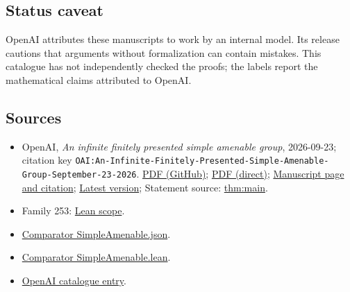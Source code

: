 \documentclass[11pt]{article}
\begin{document}
\subsection{Status caveat}
OpenAI attributes these manuscripts to work by an internal model. Its release cautions that arguments without formalization can contain mistakes. This catalogue has not independently checked the proofs; the labels report the mathematical claims attributed to OpenAI.

\subsection{Sources}
\begin{itemize}
\item OpenAI, \emph{An infinite finitely presented simple amenable group}, 2026-09-23; citation key \texttt{OAI:An-Infinite-Finitely-Presented-Simple-Amenable-Group-September-23-2026}. \href{https://github.com/openai/math/blob/adc7f1241b42e322a6451854ab7e4b4c146bf78a/preprints/An-Infinite-Finitely-Presented-Simple-Amenable-Group-September-23-2026/paper.pdf}{PDF (GitHub)}; \href{https://github.com/openai/math/raw/adc7f1241b42e322a6451854ab7e4b4c146bf78a/preprints/An-Infinite-Finitely-Presented-Simple-Amenable-Group-September-23-2026/paper.pdf}{PDF (direct)}; \href{https://github.com/openai/math/blob/adc7f1241b42e322a6451854ab7e4b4c146bf78a/preprints/An-Infinite-Finitely-Presented-Simple-Amenable-Group-September-23-2026/README.md}{Manuscript page and citation}; \href{https://github.com/openai/math/blob/main/preprints/An-Infinite-Finitely-Presented-Simple-Amenable-Group-September-23-2026/paper.pdf}{Latest version}; Statement source: \href{https://github.com/openai/math/blob/adc7f1241b42e322a6451854ab7e4b4c146bf78a/preprints/An-Infinite-Finitely-Presented-Simple-Amenable-Group-September-23-2026/build/sections/introduction.tex\#L17}{thm:main}.
\item Family 253: \href{https://github.com/openai/math/blob/adc7f1241b42e322a6451854ab7e4b4c146bf78a/lean/docs/253.md}{Lean scope}.
\item \href{https://github.com/openai/math/blob/adc7f1241b42e322a6451854ab7e4b4c146bf78a/lean/ComparatorChallenges/SimpleAmenable.json}{Comparator SimpleAmenable.json}.
\item \href{https://github.com/openai/math/blob/adc7f1241b42e322a6451854ab7e4b4c146bf78a/lean/ComparatorChallenges/SimpleAmenable.lean}{Comparator SimpleAmenable.lean}.
\item \href{https://github.com/openai/math/blob/adc7f1241b42e322a6451854ab7e4b4c146bf78a/CONTENTS.md}{OpenAI catalogue entry}.
\end{itemize}
\end{document}
